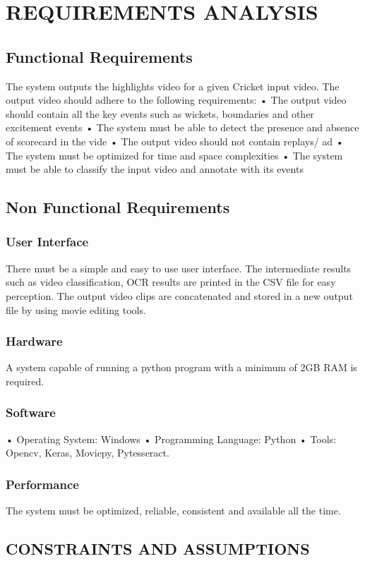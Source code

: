 
\chapter{REQUIREMENTS ANALYSIS} %

\section{Functional Requirements}
The system outputs the highlights video for a given Cricket input video. The output video should adhere to the following requirements:
• The output video should contain all the key events such as wickets, boundaries and other excitement events
• The system must be able to detect the presence and absence of scorecard in the vide
• The output video should not contain replays/ ad
• The system must be optimized for time and space complexities
• The system must be able to classify the input video and annotate with its events
\section{Non Functional Requirements}
\subsection{User Interface}
There must be a simple and easy to use user interface.
The intermediate results such as video classification, OCR results are printed in the CSV file for easy perception.
The output video clips are concatenated and stored in a new output file by using movie editing tools.
\subsection{Hardware}
A system capable of running a python program with a minimum of 2GB RAM is required.
\subsection{Software}
• Operating System: Windows
• Programming Language: Python
• Tools: Opencv, Keras, Moviepy, Pytesseract.
\subsection{Performance}
The system must be optimized, reliable, consistent and available all
the time.

\section{CONSTRAINTS AND ASSUMPTIONS}
